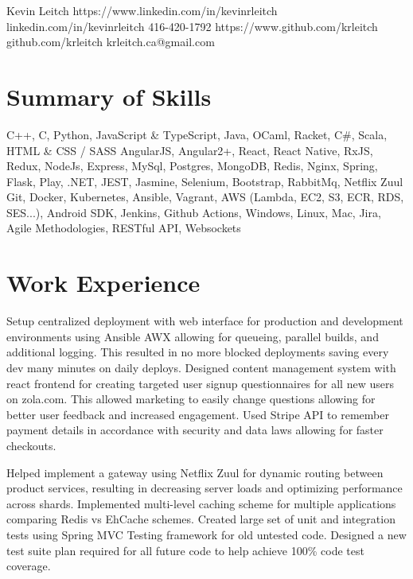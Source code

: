 \documentclass{my_resume}
\begin{document}
\myhead
{Kevin Leitch}
{https://www.linkedin.com/in/kevinrleitch}
{linkedin.com/in/kevinrleitch}
{416-420-1792}
{https://www.github.com/krleitch}
{github.com/krleitch}
{krleitch.ca@gmail.com}

\section{Summary of Skills}
{C++, C, Python, JavaScript \& TypeScript, Java, OCaml, Racket, C\#, Scala, HTML \& CSS / SASS}
{AngularJS, Angular2+, React, React Native, RxJS, Redux, NodeJs, Express, MySql, Postgres,
 MongoDB, Redis, Nginx, Spring, Flask, Play, .NET, JEST, Jasmine, Selenium, Bootstrap, RabbitMq, Netflix Zuul}
{Git, Docker, Kubernetes, Ansible, Vagrant, AWS (Lambda, EC2, S3, ECR, RDS, SES...),
 Android SDK, Jenkins, Github Actions, Windows, Linux, Mac, Jira, Agile Methodologies, RESTful API, Websockets}

\section{Work Experience}

\workitemsthree
{Setup centralized deployment with web interface for production and development environments using Ansible AWX allowing for queueing,
 parallel builds, and additional logging. This resulted in no more blocked deployments saving every dev many minutes on daily deploys.}
{Designed content management system with react frontend for creating targeted user signup questionnaires for all new users on zola.com. This allowed marketing
 to easily change questions allowing for better user feedback and increased engagement.}
{Used Stripe API to remember payment details in accordance with security and data laws allowing for faster checkouts.}

\workitemsthree
{Helped implement a gateway using Netflix Zuul for dynamic routing between product services,
 resulting in decreasing server loads and optimizing performance across shards.}
{Implemented multi-level caching scheme for multiple applications comparing Redis vs EhCache schemes.}
{Created large set of unit and integration tests using Spring MVC Testing framework for old untested code.
 Designed a new test suite plan required for all future code to help achieve 100\% code test coverage.}
\end{document}
